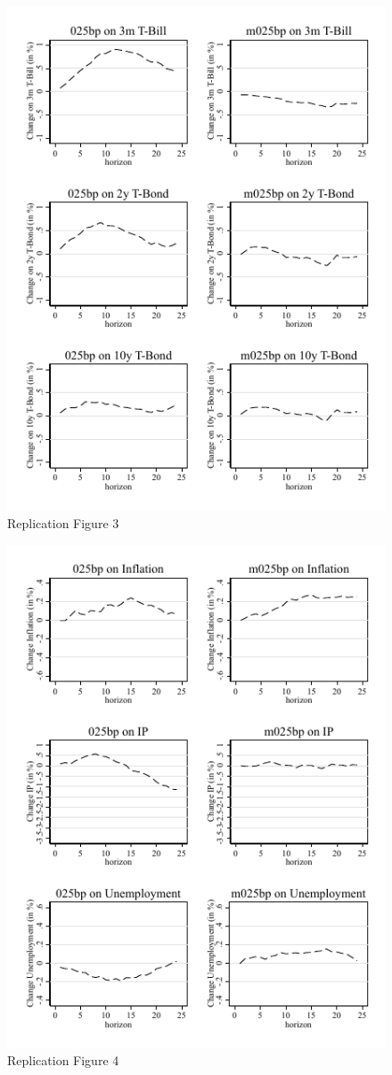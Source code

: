 \documentclass{article}
\begin{document}
\begin{figure}
	\begin{center}
		\includegraphics[scale=2]{../../output/fig_tryyields_repl.pdf}
		\caption{Replication Figure 3}
	\end{center}
\end{figure}

\begin{figure}
	\begin{center}
		\includegraphics[scale=2]{../../output/fig_realoutcomes_repl.pdf}
		\caption{Replication Figure 4}
	\end{center}
\end{figure}
\end{document}
